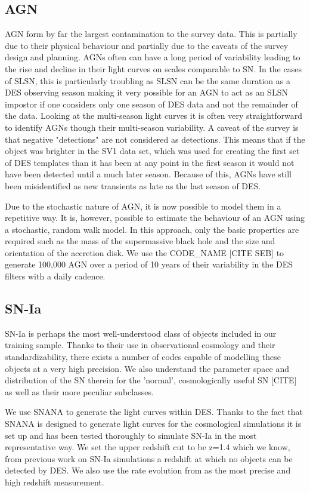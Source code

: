 \subsection{AGN}
AGN form by far the largest contamination to the survey data. This is partially due to their physical behaviour and partially due to the caveats of the survey design and planning. AGNs often can have a long period of variability leading to the rise and decline in their light curves on scales comparable to SN. In the cases of SLSN, this is particularly troubling as SLSN can be the same duration as a DES observing season making it very possible for an AGN to act as an SLSN impostor if one considers only one season of DES data and not the remainder of the data. Looking at the multi-season light curves it is often very straightforward to identify AGNs though their multi-season variability. A caveat of the survey is that negative "detections" are not considered as detections. This means that if the object was brighter in the SV1 data set, which was used for creating the first set of DES templates than it has been at any point in the first season it would not have been detected until a much later season. Because of this, AGNs have still been misidentified as new transients as late as the last season of DES.

Due to the stochastic nature of AGN, it is now possible to model them in a repetitive way. It is, however, possible to estimate the behaviour of an AGN using a stochastic, random walk model. In this approach, only the basic properties are required such as the mass of the supermassive black hole and the size and orientation of the accretion disk. We use the CODE_NAME [CITE SEB] to generate 100,000 AGN over a period of 10 years of their variability in the DES filters with a daily cadence.

\subsection{SN-Ia}
SN-Ia is perhaps the most well-understood class of objects included in our training sample. Thanks to their use in observational cosmology and their standardizability, there exists a number of codes capable of modelling these objects at a very high precision. We also understand the parameter space and distribution of the SN therein for the 'normal', cosmologically useful SN [CITE] as well as their more peculiar subclasses.

We use SNANA \citep{Kessler2010} to generate the light curves within DES. Thanks to the fact that SNANA is designed to generate light curves for the cosmological simulations it is set up and has been tested thoroughly to simulate SN-Ia in the most representative way. We set the upper redshift cut to be z=1.4 which we know, from previous work on SN-Ia simulations a redshift at which no objects can be detected by DES. We also use the rate evolution from \citet{Perrett2012} as the most precise and high redshift measurement.


